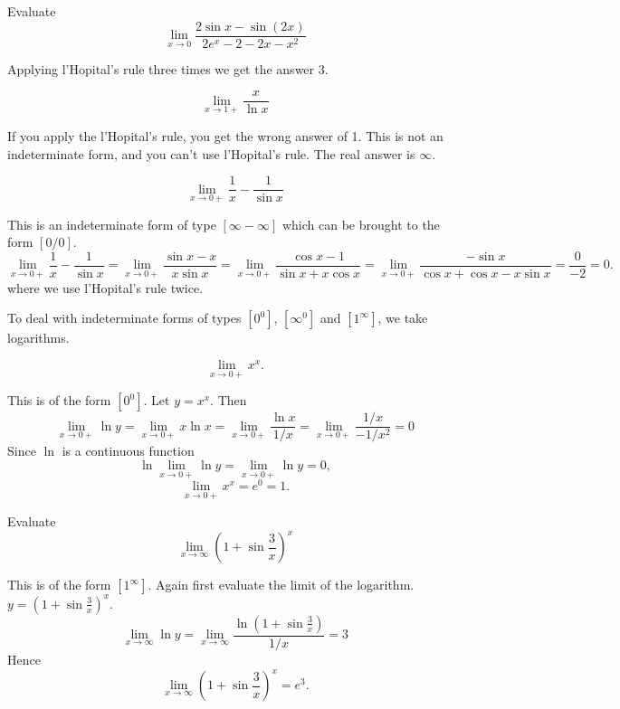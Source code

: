 \documentclass[calc1-main.tex]{subfiles}
\begin{document}
\begin{example}
  Evaluate
  \[
    \lim_{x \to 0} \frac{2\sin x-\sin(2x)}{2e^x-2-2x-x^2}
  \]
\end{example}
\begin{solution}
  Applying l'Hopital's rule three times we get the answer $3$.
\end{solution}

\begin{example}
  \[
    \lim_{x \to 1+} \frac{x}{\ln x}
  \]
\end{example}
\begin{solution}
  If you apply the l'Hopital's rule, you get the wrong answer of 1. This is not an indeterminate form, and you can't use l'Hopital's rule. The real answer is $\infty$.
\end{solution}

\begin{example}
  \[
    \lim_{x \to 0+} \frac{1}{x} - \frac{1}{\sin x}
  \]
\end{example}
\begin{solution}
  This is an indeterminate form of type $[ \infty - \infty]$ which can be brought to the form $[0/0]$.
  \[
    \lim_{x \to 0+} \frac{1}{x} - \frac{1}{\sin x} =
    \lim_{x \to 0+} \frac{\sin x - x}{x \sin x} =
    \lim_{x \to 0+} \frac{\cos x - 1}{\sin x + x \cos x} =
    \lim_{x \to 0+} \frac{-\sin x}{\cos x + \cos x - x \sin x} = \frac{0}{-2} =0.
  \]
  where we use l'Hopital's rule twice.
\end{solution}

To deal with indeterminate forms of types $[0^0]$, $[\infty^0]$ and $[1^{\infty}]$, we take logarithms.

\begin{example}
  \[
    \lim_{x \to 0+} x^x.
  \]
\end{example}
\begin{solution}
  This is of the form $[0^0]$. Let $y= x^x$. Then
  \[
    \lim_{x \to 0+} \ln y = \lim_{x \to 0+} x \ln x = \lim_{x \to 0+} \frac{\ln x}{1/x}
    = \lim_{x \to 0+} \frac{1/x}{-1/x^2} = 0
  \]
  Since $\ln$ is a continuous function
  \[
    \ln \lim_{x \to 0+} \ln y = \lim_{x \to 0+} \ln y = 0,
  \]
  \[
    \lim_{x \to 0+} x^x = e^0 = 1.
  \]
\end{solution}

\begin{example}
  Evaluate
  \[
    \lim_{x \to \infty} \left( 1+ \sin \frac{3}{x} \right)^x
  \]
\end{example}
\begin{solution}
  This is of the form $[1^{\infty}]$. Again first evaluate the limit of the logarithm. $y=\left( 1+ \sin \frac{3}{x} \right)^x$.
  \[
    \lim_{x \to \infty} \ln y =
    \lim_{x \to \infty} \frac{\ln \left( 1+ \sin \frac{3}{x} \right)}{1/x} = 3
  \]
  Hence
  \[
    \lim_{x \to \infty} \left( 1+ \sin \frac{3}{x} \right)^x = e^3.
  \]
\end{solution}
\end{document}

